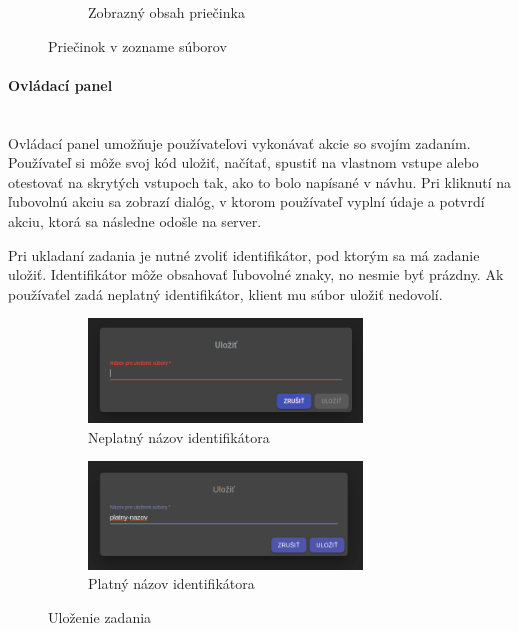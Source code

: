 \begin{figure}[H]
\begin{subfigure}{.5\textwidth}
  \caption[Zobrazný obsah priečinka]{Zobrazný obsah priečinka}
  \label{obr:zobrazeny_zoznam}
\end{subfigure}
\caption{Priečinok v zozname súborov}
\end{figure}

\paragraph{Ovládací panel}\leavevmode\\
Ovládací panel umožňuje používateľovi vykonávať akcie so svojím zadaním. Používateľ si môže svoj kód
uložiť, načítať, spustiť na vlastnom vstupe alebo otestovať na skrytých vstupoch tak, ako to bolo 
napísané v návhu. Pri kliknutí na ľubovolnú akciu sa zobrazí dialóg, v ktorom používateľ vyplní
údaje a potvrdí akciu, ktorá sa následne odošle na server.

Pri ukladaní zadania je nutné zvoliť identifikátor, pod ktorým sa má zadanie uložiť. Identifikátor
môže obsahovať ľubovolné znaky, no nesmie byť prázdny. Ak používaťel zadá neplatný 
identifikátor, klient mu súbor uložiť nedovolí.
\begin{figure}[H]
\centering
\begin{subfigure}{.5\textwidth}
  \centering
  \includegraphics[width=0.8\textwidth]{images/neplatny_nazov}
  \caption[Neplatný názov identifikátora]{Neplatný názov identifikátora}
  \label{obr:neplatny_nazov}
\end{subfigure}%
\begin{subfigure}{.5\textwidth}
  \centering
  \includegraphics[width=0.8\textwidth]{images/platny_nazov}
  \caption[Platný názov identifikátora]{Platný názov identifikátora}
  \label{obr:platny_nazov}
\end{subfigure}
\caption{Uloženie zadania}
\end{figure}

